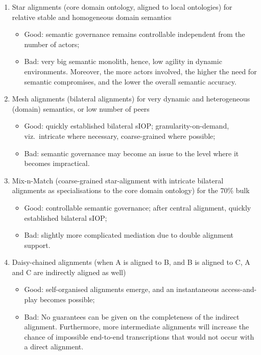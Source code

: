 \documentclass[sort&compress,preprint,authoryear,3p,twocolumn]{elsarticle}
\providecommand{\tightlist}{%
  \setlength{\itemsep}{0pt}\setlength{\parskip}{0pt}}
\begin{document}
\begin{enumerate}
\def\labelenumi{\roman{enumi}.}
\tightlist
\item
  Star alignments (core domain ontology, aligned to local ontologies)
  for relative stable and homogeneous domain semantics

  \begin{itemize}
  \tightlist
  \item
    Good: semantic governance remains controllable independent from the
    number of actors;
  \item
    Bad: very big semantic monolith, hence, low agility in dynamic
    environments. Moreover, the more actors involved, the higher the
    need for semantic compromises, and the lower the overall semantic
    accuracy.
  \end{itemize}
\item
  Mesh alignments (bilateral alignments) for very dynamic and
  heterogeneous (domain) semantics, or low number of peers

  \begin{itemize}
  \tightlist
  \item
    Good: quickly established bilateral sIOP; granularity-on-demand,
    viz.~intricate where necessary, coarse-grained where possible;
  \item
    Bad: semantic governance may become an issue to the level where it
    becomes impractical.
  \end{itemize}
\item
  Mix-n-Match (coarse-grained star-alignment with intricate bilateral
  alignments as specialisations to the core domain ontology) for the
  70\% bulk

  \begin{itemize}
  \tightlist
  \item
    Good: controllable semantic governance; after central alignment,
    quickly established bilateral sIOP;
  \item
    Bad: slightly more complicated mediation due to double alignment
    support.
  \end{itemize}
\item
  Daisy-chained alignments (when A is aligned to B, and B is aligned to
  C, A and C are indirectly aligned as well)

  \begin{itemize}
  \tightlist
  \item
    Good: self-organised alignments emerge, and an instantaneous
    access-and-play becomes possible;
  \item
    Bad: No guarantees can be given on the completeness of the indirect
    alignment. Furthermore, more intermediate alignments will increase
    the chance of impossible end-to-end transcriptions that would not
    occur with a direct alignment.
  \end{itemize}
\end{enumerate}
\end{document}
